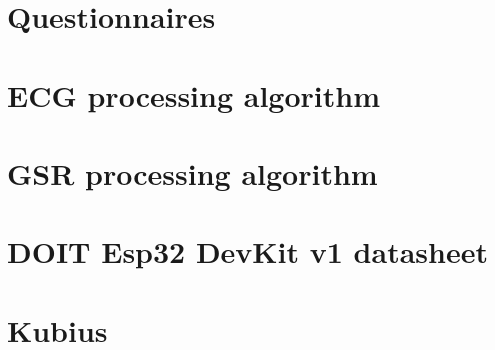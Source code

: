 \documentclass[msc, eng]{ita}    %
\begin{document}
\renewcommand\bibname{\itareferencesnamebabel} %
%


\appendix
\chapter{Questionnaires}
\label{ap:questionnaires}


%

%

\chapter{ECG processing algorithm}
\label{ap:ecg_processing_apend}


\chapter{GSR processing algorithm}
\label{ap:gsr_processing_apend}


%

\annex

\chapter{DOIT Esp32 DevKit v1 datasheet}
\label{an:esp32_annex}


\chapter{Kubius}
\label{an:kubius_annex}


%
\end{document}
